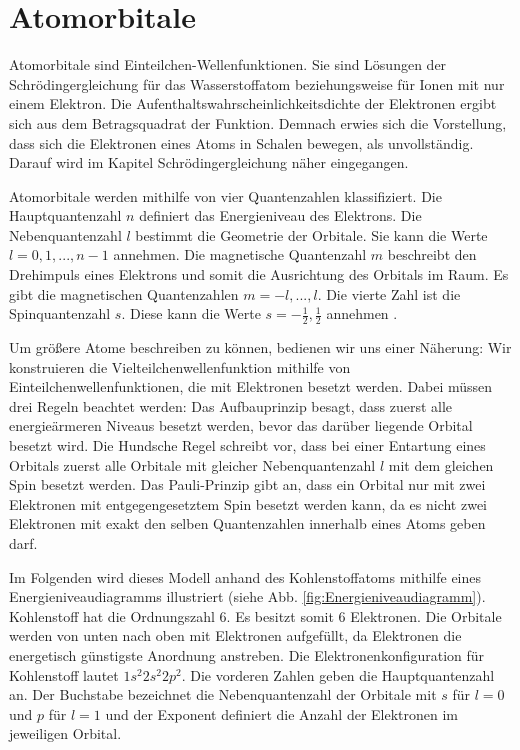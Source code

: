 \section{Atomorbitale}

Atomorbitale sind Einteilchen-Wellenfunktionen. Sie sind Lösungen der Schrödingergleichung für das Wasserstoffatom beziehungsweise für Ionen mit nur einem Elektron. Die Aufenthaltswahrscheinlichkeitsdichte der Elektronen ergibt sich aus dem Betragsquadrat der Funktion. Demnach erwies sich die Vorstellung, dass sich die Elektronen eines Atoms in Schalen bewegen, als unvollständig. Darauf wird im Kapitel Schrödingergleichung  näher eingegangen.

Atomorbitale werden mithilfe von vier Quantenzahlen klassifiziert. Die Hauptquantenzahl $n$ definiert das Energieniveau des Elektrons. Die Nebenquantenzahl $l$ bestimmt die Geometrie der Orbitale. Sie kann die Werte $l = 0, 1, ..., n-1$ annehmen. Die magnetische Quantenzahl $m$ beschreibt den Drehimpuls eines Elektrons und somit die Ausrichtung des Orbitals im Raum. Es gibt die magnetischen Quantenzahlen $m = -l,...,l$. Die vierte Zahl ist die Spinquantenzahl $s$. Diese kann die Werte $s = -\frac{1}{2}, \frac{1}{2}$ annehmen \cite{Riedel07}. 

Um größere Atome beschreiben zu können, bedienen wir uns einer Näherung: Wir konstruieren die Vielteilchenwellenfunktion mithilfe von Einteilchenwellenfunktionen, die mit Elektronen besetzt werden. Dabei müssen drei Regeln beachtet werden: Das Aufbauprinzip besagt, dass zuerst alle energieärmeren Niveaus besetzt werden, bevor das darüber liegende Orbital besetzt wird. Die Hundsche Regel schreibt vor, dass bei einer Entartung eines Orbitals zuerst alle Orbitale mit gleicher Nebenquantenzahl $l$ mit dem gleichen Spin besetzt werden. Das Pauli-Prinzip gibt an, dass ein Orbital nur mit zwei Elektronen mit entgegengesetztem Spin besetzt werden kann, da es nicht zwei Elektronen mit exakt den selben Quantenzahlen innerhalb eines Atoms geben darf.

Im Folgenden wird dieses Modell anhand des Kohlenstoffatoms mithilfe eines Energieniveaudiagramms illustriert (siehe Abb. \ref{fig:Energieniveaudiagramm}). Kohlenstoff hat die Ordnungszahl 6. Es besitzt somit 6 Elektronen. Die Orbitale werden von unten nach oben mit Elektronen aufgefüllt, da Elektronen die energetisch günstigste Anordnung anstreben.  Die Elektronenkonfiguration für Kohlenstoff lautet $1s^{2} 2s^{2} 2p^{2}$. Die vorderen Zahlen geben die Hauptquantenzahl an. Der Buchstabe bezeichnet die Nebenquantenzahl der Orbitale mit $s$ für $l = 0$ und $p$ für $l=1$ und der Exponent definiert die Anzahl der Elektronen im jeweiligen Orbital.

